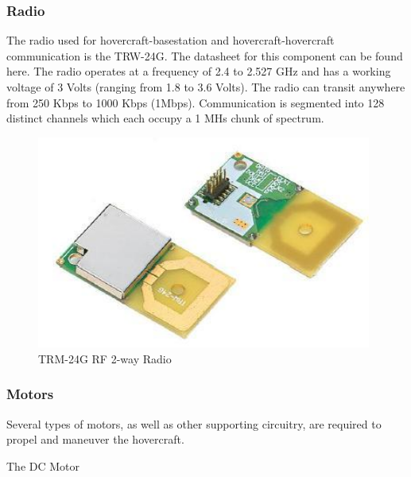 \subsubsection{Radio}
The radio used for hovercraft-basestation and hovercraft-hovercraft communication is the TRW-24G.  The datasheet for this component can be found here.  The radio operates at a frequency of 2.4 to 2.527 GHz and has a working voltage of 3 Volts (ranging from 1.8 to 3.6 Volts).  The radio can transit anywhere from 250 Kbps to 1000 Kbps (1Mbps).  Communication is segmented into 128 distinct channels which each occupy a 1 MHs chunk of spectrum. 

\begin{figure}[h]
  \begin{center}
    \includegraphics[width=110mm]{imageSources/radio.png}
  \end{center}
  \caption{TRM-24G RF 2-way Radio} 
  \label{radioFig}
\end{figure}

\subsubsection{Motors}
Several types of motors, as well as other supporting circuitry, are required to propel and maneuver the hovercraft.  

The DC Motor

